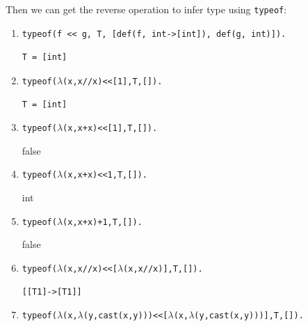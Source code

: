 \documentclass[a4paper]{exam}
\begin{document}
Then we can get the reverse operation to infer type using \texttt{typeof}:
\begin{enumerate}
  \item \begin{verbatim}
typeof(f << g, T, [def(f, int->[int]), def(g, int)]).
  \end{verbatim}

        \begin{solution}
\begin{verbatim}
T = [int]
\end{verbatim}
        \end{solution}
  \item \begin{alltt}
typeof(\(\lambda\)(x, x // x) << [1], T, []).
  \end{alltt}

        \begin{solution}
\begin{verbatim}
T = [int]
\end{verbatim}
        \end{solution}
  \item \begin{alltt}
typeof(\(\lambda\)(x, x + x) << [1], T, []).
  \end{alltt}

        \begin{solution}
false
        \end{solution}
  \item \begin{alltt}
typeof(\(\lambda\)(x, x + x) << 1, T, []).
  \end{alltt}

        \begin{solution}
int
        \end{solution}
  \item \begin{alltt}
typeof(\(\lambda\)(x, x + x) + 1, T, []).
  \end{alltt}
        \begin{solution}
false
        \end{solution}
  \item \begin{alltt}
typeof(\(\lambda\)(x, x // x) << [\(\lambda\)(x, x // x)], T, []).
  \end{alltt}

        \begin{solution}
\begin{verbatim}
[[T1]->[T1]]
\end{verbatim}
        \end{solution}
  \item \begin{alltt}
typeof(\(\lambda\)(x,\(\lambda\)(y, cast(x,y))) << [\(\lambda\)(x,\(\lambda\)(y, cast(x,y)))],T, []).
  \end{alltt}


\end{enumerate}
\end{document}
